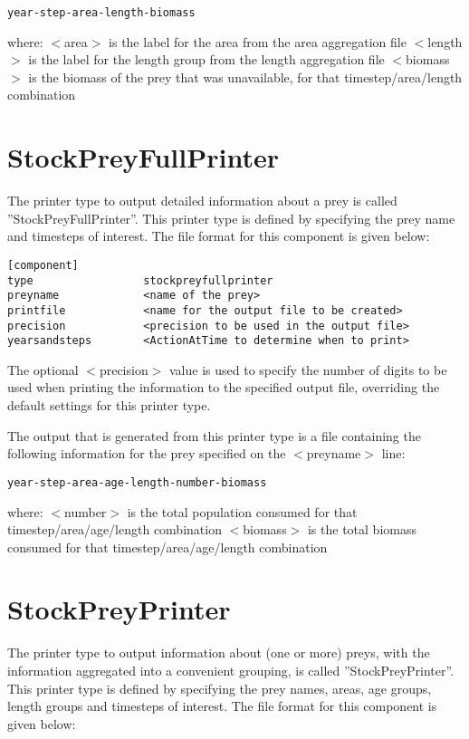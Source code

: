 \documentclass[10pt,twoside]{book}
\begin{document}
{\small\begin{verbatim}
year-step-area-length-biomass
\end{verbatim}}

where:\newline
$<$area$>$ is the label for the area from the area aggregation file\newline
$<$length$>$ is the label for the length group from the length aggregation file\newline
$<$biomass$>$ is the biomass of the prey that was unavailable, for that timestep/area/length combination

\section{StockPreyFullPrinter}\label{sec:stockpreyfullprinter}
The printer type to output detailed information about a prey is called ''StockPreyFullPrinter''.  This printer type is defined by specifying the prey name and timesteps of interest.  The file format for this component is given below:

{\small\begin{verbatim}
[component]
type                 stockpreyfullprinter
preyname             <name of the prey>
printfile            <name for the output file to be created>
precision            <precision to be used in the output file>
yearsandsteps        <ActionAtTime to determine when to print>
\end{verbatim}}

The optional $<$precision$>$ value is used to specify the number of digits to be used when printing the information to the specified output file, overriding the default settings for this printer type.

\bigskip
The output that is generated from this printer type is a file containing the following information for the prey specified on the $<$preyname$>$ line:

{\small\begin{verbatim}
year-step-area-age-length-number-biomass
\end{verbatim}}

where:\newline
$<$number$>$ is the total population consumed for that timestep/area/age/length combination\newline
$<$biomass$>$ is the total biomass consumed for that timestep/area/age/length combination

\section{StockPreyPrinter}\label{sec:stockpreyprinter}
The printer type to output information about (one or more) preys, with the information aggregated into a convenient grouping, is called ''StockPreyPrinter''.  This printer type is defined by specifying the prey names, areas, age groups, length groups and timesteps of interest.  The file format for this component is given below:
\end{document}
